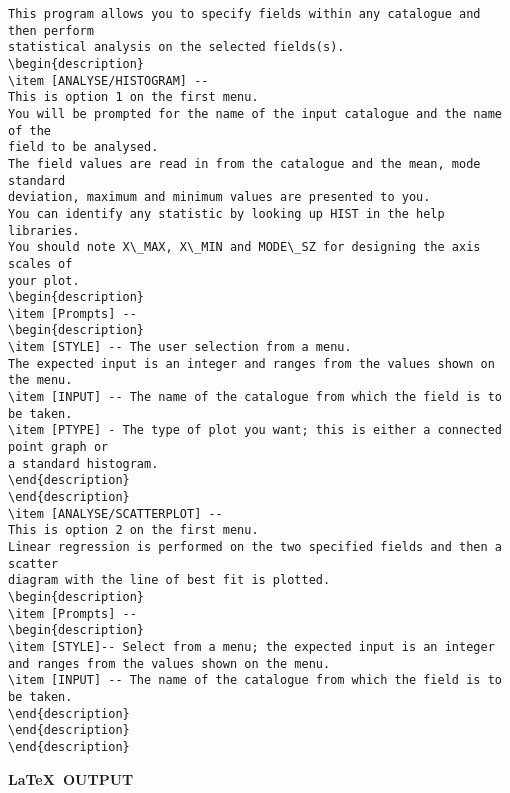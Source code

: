 \begin{verbatim}
This program allows you to specify fields within any catalogue and then perform
statistical analysis on the selected fields(s).
\begin{description}
\item [ANALYSE/HISTOGRAM] --
This is option 1 on the first menu.
You will be prompted for the name of the input catalogue and the name of the
field to be analysed.
The field values are read in from the catalogue and the mean, mode standard
deviation, maximum and minimum values are presented to you.
You can identify any statistic by looking up HIST in the help libraries.
You should note X\_MAX, X\_MIN and MODE\_SZ for designing the axis scales of
your plot.
\begin{description}
\item [Prompts] --
\begin{description}
\item [STYLE] -- The user selection from a menu.
The expected input is an integer and ranges from the values shown on the menu.
\item [INPUT] -- The name of the catalogue from which the field is to be taken.
\item [PTYPE] - The type of plot you want; this is either a connected point graph or
a standard histogram.
\end{description}
\end{description}
\item [ANALYSE/SCATTERPLOT] --
This is option 2 on the first menu.
Linear regression is performed on the two specified fields and then a scatter
diagram with the line of best fit is plotted.
\begin{description}
\item [Prompts] --
\begin{description}
\item [STYLE]-- Select from a menu; the expected input is an integer
and ranges from the values shown on the menu.
\item [INPUT] -- The name of the catalogue from which the field is to be taken.
\end{description}
\end{description}
\end{description}
\end{verbatim}

\newpage

\begin{center}
{\bf \LaTeX\ OUTPUT}
\end{center}

